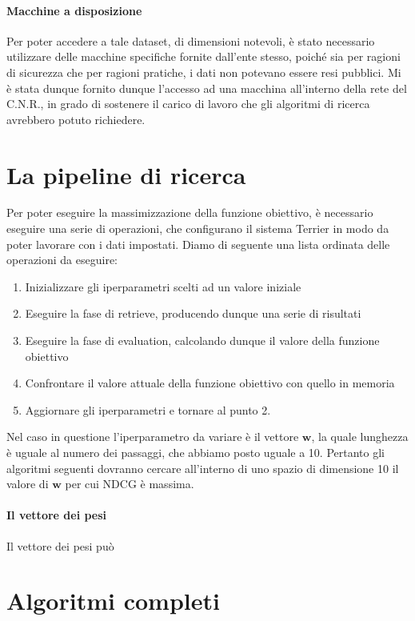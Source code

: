 \paragraph{Macchine a disposizione}
Per poter accedere a tale dataset, di dimensioni notevoli, è stato necessario utilizzare
delle macchine specifiche fornite dall'ente stesso, poiché sia per ragioni di sicurezza
che per ragioni pratiche, i dati non potevano essere resi pubblici.
Mi è stata dunque fornito dunque l'accesso ad una macchina 
all'interno della rete del C.N.R., in grado di sostenere il carico
di lavoro che gli algoritmi di ricerca avrebbero potuto richiedere.

\section{La pipeline di ricerca}
Per poter eseguire la massimizzazione della funzione obiettivo,
è necessario eseguire una serie di operazioni, che configurano il sistema Terrier
in modo da poter lavorare con i dati impostati.
Diamo di seguente una lista ordinata delle operazioni da eseguire:

\begin{enumerate}
	\item Inizializzare gli iperparametri scelti ad un valore iniziale
	\item Eseguire la fase di retrieve, producendo dunque una serie di risultati
	\item Eseguire la fase di evaluation, calcolando dunque il valore della funzione obiettivo
	\item Confrontare il valore attuale della funzione obiettivo con quello in memoria
	\item Aggiornare gli iperparametri e tornare al punto 2.
\end{enumerate}

Nel caso in questione l'iperparametro da variare è il vettore $\boldsymbol{w}$, la
quale lunghezza è uguale al numero dei passaggi, che abbiamo posto uguale a 10.
Pertanto gli algoritmi seguenti dovranno cercare all'interno di uno spazio di dimensione
10 il valore di $\boldsymbol{w}$ per cui NDCG è massima.

\paragraph{Il vettore dei pesi}
Il vettore dei pesi può 

\section{Algoritmi completi}


